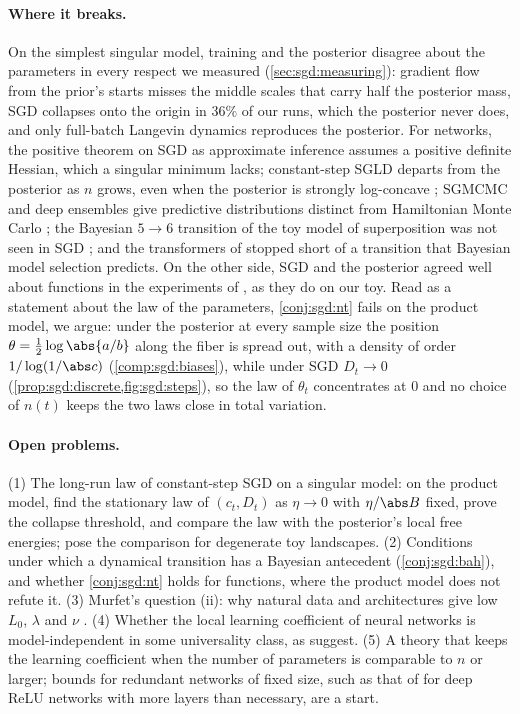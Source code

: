 \begin{refsection}
\paragraph{Where it breaks.} On the simplest singular model, training and the posterior disagree about the parameters in every respect we measured (\cref{sec:sgd:measuring}): gradient flow from the prior's starts misses the middle scales that carry half the posterior mass, SGD collapses onto the origin in $36\%$ of our runs, which the posterior never does, and only full-batch Langevin dynamics reproduces the posterior. For networks, the positive theorem on SGD as approximate inference \parencite{MandtEtAl2017} assumes a positive definite Hessian, which a singular minimum lacks; constant-step SGLD departs from the posterior as $n$ grows, even when the posterior is strongly log-concave \parencite{BrosseEtAl2018}; SGMCMC and deep ensembles give predictive distributions distinct from Hamiltonian Monte Carlo \parencite{IzmailovEtAl2021}; the Bayesian $5\to6$ transition of the toy model of superposition was not seen in SGD \parencite{ChenEtAl2023}; and the transformers of \textcite{CarrollEtAl2025} stopped short of a transition that Bayesian model selection predicts. On the other side, SGD and the posterior agreed well about functions in the experiments of \textcite{MingardEtAl2021}, as they do on our toy. Read as a statement about the law of the parameters, \cref{conj:sgd:nt} fails on the product model, we argue: under the posterior at every sample size the position $\theta=\frac12\log\abs{a/b}$ along the fiber is spread out, with a density of order $1/\log(1/\abs c)$ (\cref{comp:sgd:biases}), while under SGD $D_t\to0$ (\cref{prop:sgd:discrete,fig:sgd:steps}), so the law of $\theta_t$ concentrates at $0$ and no choice of $n(t)$ keeps the two laws close in total variation.

\paragraph{Open problems.} (1) The long-run law of constant-step SGD on a singular model: on the product model, find the stationary law of $(c_t,D_t)$ as $\eta\to0$ with $\eta/\abs B$ fixed, prove the collapse threshold, and compare the law with the posterior's local free energies; \textcite{CorlouerMace2024} pose the comparison for degenerate toy landscapes. (2) Conditions under which a dynamical transition has a Bayesian antecedent (\cref{conj:sgd:bah}), and whether \cref{conj:sgd:nt} holds for functions, where the product model does not refute it. (3) Murfet's question (ii): why natural data and architectures give low $L_0$, $\lambda$ and $\nu$ \parencite{Murfet2023a}. (4) Whether the local learning coefficient of neural networks is model-independent in some universality class, as \textcite[Appendix~F]{LauEtAl2025} suggest. (5) A theory that keeps the learning coefficient when the number of parameters is comparable to $n$ or larger; bounds for redundant networks of fixed size, such as that of \textcite{NagayasuWatanabe2023} for deep ReLU networks with more layers than necessary, are a start.


\end{refsection}
